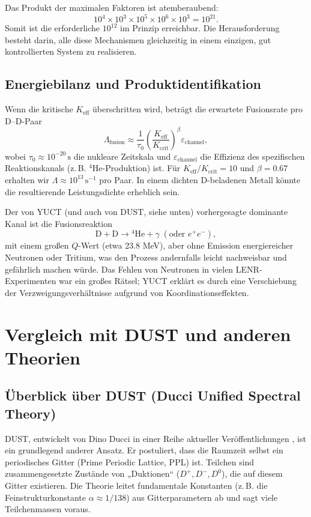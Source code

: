 \documentclass[12pt]{article}
\theoremstyle{remark}
\newcommand{\Keff}{K_{\mathrm{eff}}}
\newcommand{\Kcrit}{K_{\mathrm{crit}}}
\begin{document}
	Das Produkt der maximalen Faktoren ist atemberaubend:
	\[
	10^4 \times 10^3 \times 10^5 \times 10^6 \times 10^3 = 10^{21}.
	\]
	Somit ist die erforderliche \(10^{12}\) im Prinzip erreichbar. Die Herausforderung besteht darin, alle diese Mechanismen gleichzeitig in einem einzigen, gut kontrollierten System zu realisieren.
	
	\subsection{Energiebilanz und Produktidentifikation}
	
	Wenn die kritische \(\Keff\) überschritten wird, beträgt die erwartete Fusionsrate pro D–D-Paar
	\begin{equation}
		\Lambda_{\text{fusion}} \approx \frac{1}{\tau_0} \left( \frac{\Keff}{\Kcrit} \right)^{\beta} \varepsilon_{\text{channel}},
		\label{eq:fusion-rate}
	\end{equation}
	wobei \(\tau_0 \approx 10^{-20}\,\text{s}\) die nukleare Zeitskala und \(\varepsilon_{\text{channel}}\) die Effizienz des spezifischen Reaktionskanals (z. B. \(^4\)He-Produktion) ist. Für \(\Keff/\Kcrit = 10\) und \(\beta = 0.67\) erhalten wir \(\Lambda \approx 10^{13}\,\text{s}^{-1}\) pro Paar. In einem dichten D-beladenen Metall könnte die resultierende Leistungsdichte erheblich sein.
	
	Der von YUCT (und auch von DUST, siehe unten) vorhergesagte dominante Kanal ist die Fusionsreaktion
	\[
	\mathrm{D} + \mathrm{D} \to {}^4\mathrm{He} + \gamma\;(\text{oder } e^+e^-),
	\]
	mit einem großen \(Q\)-Wert (etwa 23.8 MeV), aber ohne Emission energiereicher Neutronen oder Tritium, was den Prozess andernfalls leicht nachweisbar und gefährlich machen würde. Das Fehlen von Neutronen in vielen LENR-Experimenten war ein großes Rätsel; YUCT erklärt es durch eine Verschiebung der Verzweigungsverhältnisse aufgrund von Koordinationseffekten.
	
	\section{Vergleich mit DUST und anderen Theorien}
	\label{sec:comparison}
	
	\subsection{Überblick über DUST (Ducci Unified Spectral Theory)}
	
	DUST, entwickelt von Dino Ducci in einer Reihe aktueller Veröffentlichungen \cite{Ducci2025,Ducci2026a,Ducci2026b}, ist ein grundlegend anderer Ansatz. Er postuliert, dass die Raumzeit selbst ein periodisches Gitter (Prime Periodic Lattice, PPL) ist. Teilchen sind zusammengesetzte Zustände von „Duktionen“ (\(D^+, D^-, D^0\)), die auf diesem Gitter existieren. Die Theorie leitet fundamentale Konstanten (z. B. die Feinstrukturkonstante \(\alpha \approx 1/138\)) aus Gitterparametern ab und sagt viele Teilchenmassen voraus.
	
\end{document}

